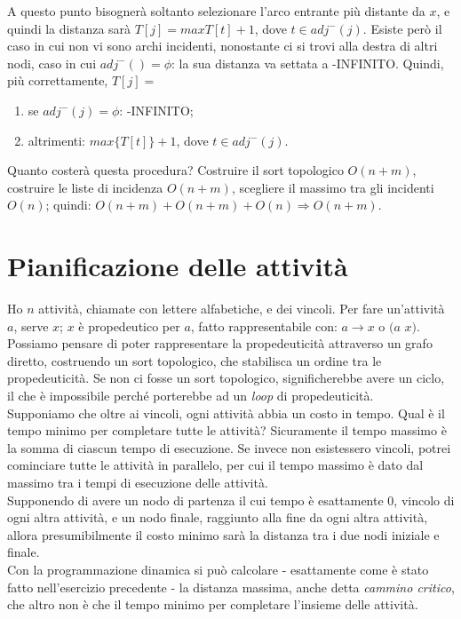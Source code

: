 A questo punto bisognerà soltanto selezionare l'arco entrante più distante da $x$, e quindi la distanza sarà $T[j] = max{T[t]} + 1$, dove $t \in adj^-(j)$. Esiste però il caso in cui non vi sono archi incidenti, nonostante ci si trovi alla destra di altri nodi, caso in cui $adj^-() = \phi$: la sua distanza va settata a -INFINITO. Quindi, più correttamente, $T[j] =$
\begin{enumerate}
	\item se $adj^-(j) = \phi$: -INFINITO;
	\item altrimenti: $max\{T[t]\} + 1$, dove $t \in adj^-(j)$.
\end{enumerate}
Quanto costerà questa procedura? Costruire il sort topologico $O(n+m)$, costruire le liste di incidenza $O(n+m)$, scegliere il massimo tra gli incidenti $O(n)$; quindi: $O(n+m) + O(n+m) + O(n) \Rightarrow O(n+m)$.

\section{Pianificazione delle attività}
Ho $n$ attività, chiamate con lettere alfabetiche, e dei vincoli. Per fare un'attività $a$, serve $x$; $x$ è propedeutico per $a$, fatto rappresentabile con: $a \to x$ o $(a$ $x)$. Possiamo pensare di poter rappresentare la propedeuticità attraverso un grafo diretto, costruendo un sort topologico, che stabilisca un ordine tra le propedeuticità. Se non ci fosse un sort topologico, significherebbe avere un ciclo, il che è impossibile perché porterebbe ad un \textit{loop} di propedeuticità. \\
Supponiamo che oltre ai vincoli, ogni attività abbia un costo in tempo. Qual è il tempo minimo per completare tutte le attività? Sicuramente il tempo massimo è la somma di ciascun tempo di esecuzione. Se invece non esistessero vincoli, potrei cominciare tutte le attività in parallelo, per cui il tempo massimo è dato dal massimo tra i tempi di esecuzione delle attività. \\
Supponendo di avere un nodo di partenza il cui tempo è esattamente 0, vincolo di ogni altra attività, e un nodo finale, raggiunto alla fine da ogni altra attività, allora presumibilmente il costo minimo sarà la distanza tra i due nodi iniziale e finale. \\
Con la programmazione dinamica si può calcolare - esattamente come è stato fatto nell'esercizio precedente - la distanza massima, anche detta \textit{cammino critico}, che altro non è che il tempo minimo per completare l'insieme delle attività. \\ \\

